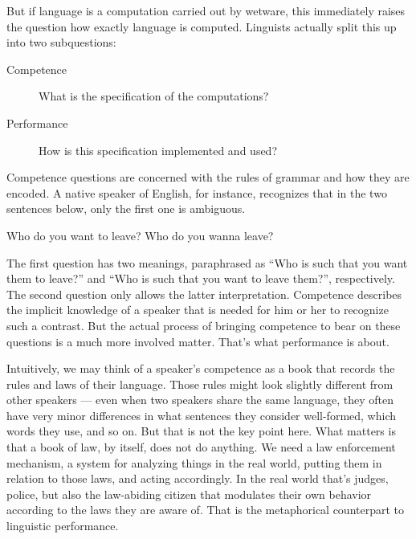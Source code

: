 But if language is a computation carried out by wetware, this immediately raises the question how exactly language is computed.
Linguists actually split this up into two subquestions:
%
\begin{description}
    \item[Competence]
        What is the specification of the computations?
    \item[Performance]
        How is this specification implemented and used?
\end{description}
%
Competence questions are concerned with the rules of grammar and how they are encoded.
A native speaker of English, for instance, recognizes that in the two sentences below, only the first one is ambiguous.
%
\begin{exe}
    \ex
    \begin{xlist}
        \ex Who do you want to leave?
        \ex Who do you wanna leave?
    \end{xlist}
\end{exe}
%
The first question has two meanings, paraphrased as ``Who is such that you want them to leave?'' and ``Who is such that you want to leave them?'', respectively.
The second question only allows the latter interpretation.
Competence describes the implicit knowledge of a speaker that is needed for him or her to recognize such a contrast.
But the actual process of bringing competence to bear on these questions is a much more involved matter.
That's what performance is about.

Intuitively, we may think of a speaker's competence as a book that records the rules and laws of their language.
Those rules might look slightly different from other speakers --- even when two speakers share the same language, they often have very minor differences in what sentences they consider well-formed, which words they use, and so on.
But that is not the key point here.
What matters is that a book of law, by itself, does not do anything.
We need a law enforcement mechanism, a system for analyzing things in the real world, putting them in relation to those laws, and acting accordingly.
In the real world that's judges, police, but also the law-abiding citizen that modulates their own behavior according to the laws they are aware of.
That is the metaphorical counterpart to linguistic performance.

